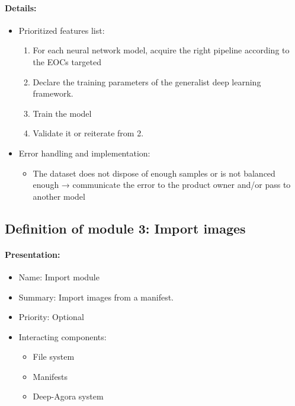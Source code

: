 \documentclass{polytech/polytech}
\numberwithin{figure}{chapter}
\begin{document}
\begin{appendix}
\begin{itemize}
\end{itemize}

\paragraph{Details:}

\begin{itemize}
    \item Prioritized features list: 
    \begin{enumerate}
        \item	For each neural network model, acquire the right pipeline according to the EOCs targeted
        \item	Declare the training parameters of the generalist deep learning framework.
        \item	Train the model
        \item	Validate it or reiterate from 2.
    \end{enumerate}
    \item Error handling and implementation: 
    \begin{itemize}
        \item	The dataset does not dispose of enough samples or is not balanced enough → communicate the error to the product owner and/or pass to another model 
    \end{itemize}
\end{itemize}


\subsection{Definition of module 3: Import images}

\paragraph{Presentation:}
 
\begin{itemize}
    \item Name: Import module
    \item Summary: Import images from a manifest.
    \item Priority: Optional
    \item Interacting components:
    \begin{itemize}
        \item File system
        \item Manifests
        \item Deep-Agora system
    \end{itemize}
\end{itemize}


\end{appendix}
\end{document}
